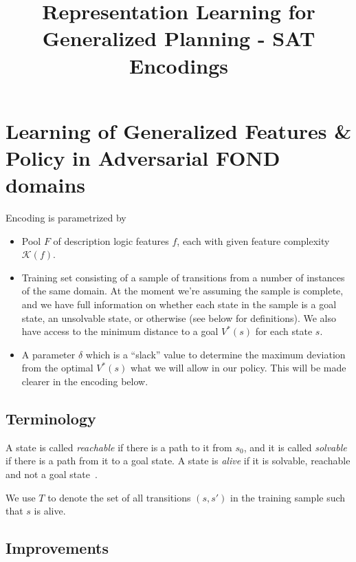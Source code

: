 \documentclass[a4paper]{article}
\title{Representation Learning for Generalized Planning - SAT Encodings}
\begin{document}
\maketitle

\section{Learning of Generalized Features \& Policy in Adversarial FOND domains}

Encoding is parametrized by
\begin{itemize}
 \item Pool $F$ of description logic features $f$, each with given feature complexity $\mathcal{K}(f)$.
 \item Training set consisting of a sample of transitions from a number of instances of the same domain.
       At the moment we're assuming the sample is complete, and we have full information on whether each state
       in the sample is a goal state, an unsolvable state, or otherwise (see below for definitions). We also have access
       to the minimum distance to a goal $V^*(s)$ for each state $s$.
 \item A parameter $\delta$ which is a ``slack'' value to determine the maximum deviation from the optimal $V^*(s)$
 what we will allow in our policy. This will be made clearer in the encoding below.
\end{itemize}


\subsection{Terminology}
A state is called \emph{reachable} if there is a path to it from $s_0$, and
it is called \emph{solvable} if there is a path from it to a goal
state.
A state is \emph{alive} if it is solvable, reachable and not a
goal state~\cite{frances-et-al-ijcai2019}.

We use $T$ to denote the set of all transitions $(s, s')$ in the training sample such that $s$ is alive.

\subsection{Improvements}
\end{document}
